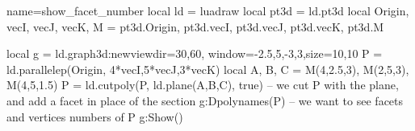 \begin{luadraw}{name=show_facet_number}
local ld = luadraw
local pt3d = ld.pt3d
local Origin, vecI, vecJ, vecK, M = pt3d.Origin, pt3d.vecI, pt3d.vecJ, pt3d.vecK, pt3d.M

local g = ld.graph3d:new{viewdir={30,60}, window={-2.5,5,-3,3},size={10,10}}
P = ld.parallelep(Origin, 4*vecI,5*vecJ,3*vecK)
local A, B, C = M(4,2.5,3), M(2,5,3), M(4,5,1.5)
P = ld.cutpoly(P, ld.plane(A,B,C), true) -- we cut P with the plane, and add a facet in place of the section
g:Dpolynames(P) -- we want to see facets and vertices numbers of P
g:Show()
\end{luadraw}
